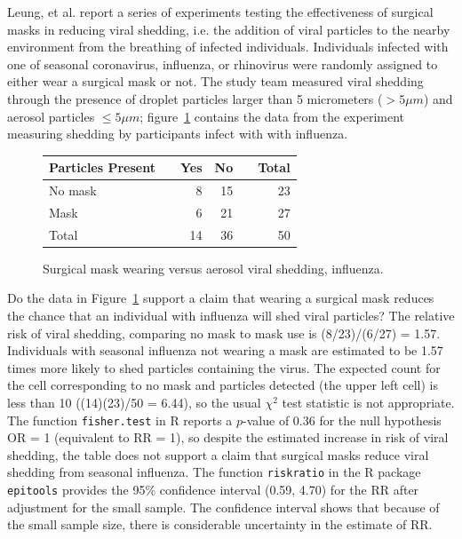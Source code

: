 Leung, et al. report a series of experiments testing the effectiveness of surgical masks in reducing viral shedding, i.e. the addition of viral particles to the nearby environment from the breathing of infected individuals.  Individuals infected with one of seasonal coronavirus, influenza, or rhinovirus were randomly assigned to either wear a surgical mask or not.  The study team measured viral shedding through the presence of droplet particles larger than 5 micrometers ($> 5\mu m$) and aerosol particles $\leq 5\mu m$; figure~\ref{figure:influenzaAerosolViralShedding} contains the data from the experiment measuring shedding by participants infect with with influenza. 
\begin{figure}[h]
	\centering
	\begin{tabular}{ll rrr |r}
		\hline
		Particles Present	& \hspace{2mm} & Yes & No & \hspace{2mm} & Total \\
		\hline
        No mask & & 8 & 15 & & 23    \\
        Mask &	& 6 & 21 & & 27    \\
        \hline
        Total & & 14 & 36 & & 50 \\
		\hline
	\end{tabular}
	\caption{Surgical mask wearing versus aerosol viral shedding, influenza.}
    \label{figure:influenzaAerosolViralShedding}
\end{figure}	

\begin{examplewrap}
  \begin{nexample}{Do the data in Figure~\ref{figure:influenzaAerosolViralShedding} support a claim that wearing a surgical mask reduces the chance that an individual with influenza will shed viral particles?} 
    The relative risk of viral shedding, comparing no mask to mask use is (8/23)/(6/27) = 1.57.  Individuals with seasonal influenza not wearing a mask are estimated to be 1.57 times more likely to shed particles containing the virus. The expected count for the cell corresponding to no mask and particles detected (the upper left cell) is less than 10 ((14)(23)/50 = 6.44), so the usual $\chi^2$ test statistic is not appropriate.  The function \texttt{fisher.test} in \textsf{R} reports a $p$-value of 0.36 for the null hypothesis OR = 1 (equivalent to RR = 1), so despite the estimated increase in risk of viral shedding, the table does not support a claim that surgical masks reduce viral shedding from seasonal influenza.  The function \texttt{riskratio} in the \textsf{R} package \texttt{epitools} provides the 95\% confidence interval (0.59, 4.70) for the RR after adjustment for the small sample.  The confidence interval shows that because of the small sample size, there is considerable uncertainty in the estimate of RR.

  \end{nexample}
\end{examplewrap}

